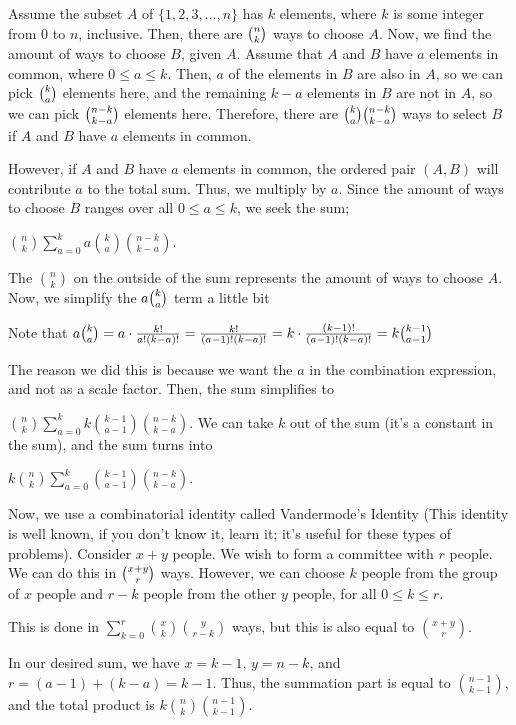 \begin{enumerate}
Assume the subset $A$ of $\{1, 2, 3, \dots, n\}$ has $k$ elements, where $k$ is some integer from $0$ to $n$, inclusive. Then, there are $\tbinom{n}{k}$ ways to choose $A$. Now, we find the amount of ways to choose $B$, given $A$. Assume that $A$ and $B$ have $a$ elements in common, where $0 \le a \le k$. Then, $a$ of the elements in $B$ are also in $A$, so we can pick $\tbinom{k}{a}$ elements here, and the remaining $k-a$ elements in $B$ are $\underline{\text{not}}$ in $A$, so we can pick $\tbinom{n-k}{k-a}$ elements here. Therefore, there are $\tbinom{k}{a}\tbinom{n-k}{k-a}$ ways to select $B$ if $A$ and $B$ have $a$ elements in common.

 However, if $A$ and $B$ have $a$ elements in common, the ordered pair $(A, B)$ will contribute $a$ to the total sum. Thus, we multiply by $a$. Since the amount of ways to choose $B$ ranges over all $0 \le a \le k$, we seek the sum;

 $\binom{n}{k}\sum_{a=0}^{k} a\binom{k}{a}\binom{n-k}{k-a}$. 

 The $\binom{n}{k}$ on the outside of the sum represents the amount of ways to choose $A$. Now, we simplify the $a\tbinom{k}{a}$ term a little bit

 Note that $a\tbinom{k}{a}=a \cdot \frac{k!}{a!(k-a)!}=\frac{k!}{(a-1)!(k-a)!}=k \cdot \frac{(k-1)!}{(a-1)!(k-a)!}=k\binom{k-1}{a-1}$

 The reason we did this is because we want the $a$ in the combination expression, and not as a scale factor. Then, the sum simplifies to 

 $\binom{n}{k} \sum_{a=0}^{k} k\binom{k-1}{a-1}\binom{n-k}{k-a}$. We can take $k$ out of the sum (it's a constant in the sum), and the sum turns into

 $k\binom{n}{k}\sum_{a=0}^{k}\binom{k-1}{a-1}\binom{n-k}{k-a}$.

 Now, we use a combinatorial identity called Vandermode's Identity (This identity is well known, if you don't know it, learn it; it's useful for these types of problems). Consider $x+y$ people. We wish to form a committee with $r$ people. We can do this in $\tbinom{x+y}{r}$ ways. However, we can choose $k$ people from the group of $x$ people and $r-k$ people from the other $y$ people, for all $0 \le k \le r$. 

 This is done in $\sum_{k=0}^{r} \binom{x}{k} \binom{y}{r-k}$ ways, but this is also equal to $\binom{x+y}{r}$.

 In our desired sum, we have $x=k-1$, $y=n-k$, and $r=(a-1)+(k-a)=k-1$. Thus, the summation part is equal to $\binom{n-1}{k-1}$, and the total product is $k\binom{n}{k}\binom{n-1}{k-1}$.


\end{enumerate}
